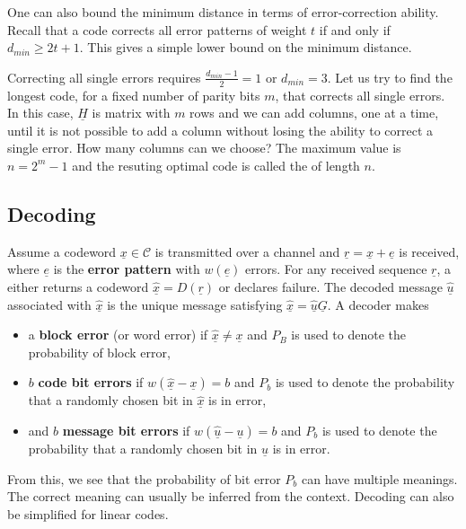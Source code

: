 One can also bound the minimum distance in terms of error-correction ability.
Recall that a code corrects all error patterns of weight $t$ if and only if $d_{min}\geq2t+1$.
This gives a simple lower bound on the minimum distance.

\begin{example}
Correcting all single errors requires $\frac{d_{min}-1}{2}=1$ or $d_{min}=3$.
Let us try to find the longest code, for a fixed number of parity bits $m$, that corrects all single errors.
In this case, $\underline{H}$ is  matrix with $m$ rows and we can add columns, one at a time, until it is not possible to add a column without losing the ability to correct a single error.
How many columns can we choose?
The maximum value is $n=2^m -1$ and the resuting optimal code is called the  of length $n$.
\end{example}

\subsection{Decoding}

Assume a codeword $\underline{x}\in\mathcal{C}$ is transmitted over a channel and $\underline{r}=\underline{x}+\underline{e}$ is received, where $\underline{e}$ is the \textbf{error pattern} with $w(\underline{e})$ errors.
For any received sequence $\underline{r}$, a  either returns a codeword $\underline{\hat{x}}=D(\underline{r})$ or declares failure.
The decoded message $\underline{\hat{u}}$ associated with $\underline{\hat{x}}$ is the unique message satisfying $\underline{\hat{x}} = \underline{\hat{u}} \underline{G}$.
A decoder makes
\begin{itemize}
\item a \textbf{block error} (or word error) if $\underline{\hat{x}}\neq\underline{x}$ and $P_{B}$ is used to denote the probability of block error,
\item $b$ \textbf{code bit errors} if $w(\underline{\hat{x}}-\underline{x})=b$ and $P_{b}$ is used to denote the probability that a randomly chosen bit in $\underline{\hat{x}}$ is in error,
\item and $b$ \textbf{message bit errors} if $w(\underline{\hat{u}}-\underline{u})=b$ and $P_{b}$ is used to denote the probability that a randomly chosen bit in $\underline{\hat{u}}$ is in error.
\end{itemize}
From this, we see that the probability of bit error $P_{b}$ can have multiple meanings.
The correct meaning can usually be inferred from the context.
Decoding can also be simplified for linear codes.

